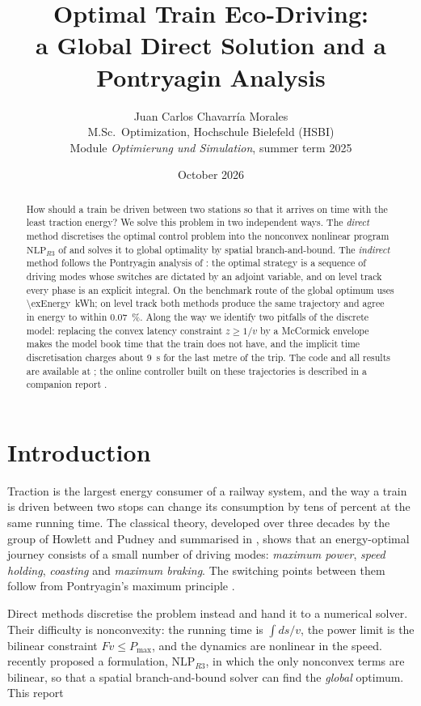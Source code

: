 \documentclass[11pt,a4paper]{article}
\title{Optimal Train Eco-Driving:\\ a Global Direct Solution and a Pontryagin Analysis}
\author{Juan Carlos Chavarr\'ia Morales\\[2pt]
  \small M.Sc.\ Optimization, Hochschule Bielefeld (HSBI)\\
  \small Module \emph{Optimierung und Simulation}, summer term 2025}
\date{October 2026}
\newcommand{\NLP}{\text{NLP}_{R3}}
\begin{document}
\maketitle

\begin{abstract}
How should a train be driven between two stations so that it arrives on time with the least traction energy?
We solve this problem in two independent ways. The \emph{direct} method discretises the optimal control problem
into the nonconvex nonlinear program $\NLP$ of \citet{Xiao2025} and solves it to global optimality by spatial
branch-and-bound. The \emph{indirect} method follows the Pontryagin analysis of \citet{Albrecht2016a}: the optimal
strategy is a sequence of driving modes whose switches are dictated by an adjoint variable, and on level track every
phase is an explicit integral. On the benchmark route of \citet{Xiao2025} the global optimum uses
\SI{\exEnergy}{kWh}; on level track both methods produce the same trajectory and agree in energy to within
\SI{0.07}{\percent}. Along the way we identify two pitfalls of the discrete model: replacing the convex latency
constraint $z \ge 1/v$ by a McCormick envelope makes the model book time that the train does not have, and the
implicit time discretisation charges about \SI{9}{s} for the last metre of the trip. The code and all results are
available at \citet{RepoOptimal}; the online controller built on these trajectories is described in a companion
report \citep{RepoMPC}.
\end{abstract}

\section{Introduction}

Traction is the largest energy consumer of a railway system, and the way a train is driven between two stops can
change its consumption by tens of percent at the same running time. The classical theory, developed over three decades
by the group of Howlett and Pudney and summarised in \citet{Albrecht2016a,Albrecht2016b}, shows that an
energy-optimal journey consists of a small number of driving modes: \emph{maximum power}, \emph{speed holding},
\emph{coasting} and \emph{maximum braking}. The switching points between them follow from Pontryagin's maximum
principle \citep{Pontryagin1962}.

Direct methods discretise the problem instead and hand it to a numerical solver. Their difficulty is nonconvexity: the
running time is $\int ds/v$, the power limit is the bilinear constraint $F v \le P_{\max}$, and the dynamics are
nonlinear in the speed. \citet{Xiao2025} recently proposed a formulation, $\NLP$, in which the only nonconvex terms are
bilinear, so that a spatial branch-and-bound solver can find the \emph{global} optimum. This report
\end{document}
